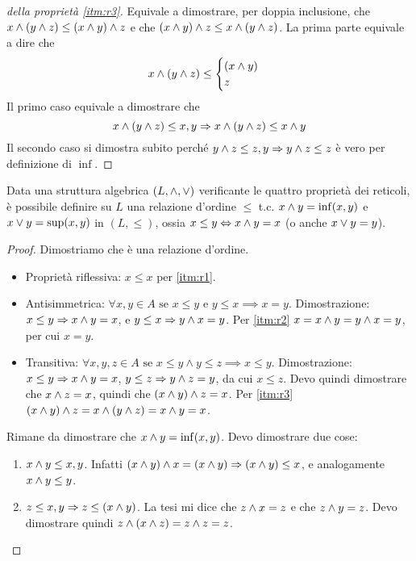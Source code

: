 \begin{proof}[della propriet\`a \ref{itm:r3}]
Equivale a dimostrare, per doppia inclusione, che $x \wedge ( y \wedge z) \leq (x \wedge y) \wedge z$ e che $(x \wedge y) \wedge z \leq x \wedge ( y \wedge z)$. La prima parte equivale a dire che
\[
x \wedge (y \wedge z) \leq 
\begin{cases}
(x \wedge y) \\
 z
 \end{cases}
\]
Il primo caso equivale a dimostrare che
\[
x \wedge (y \wedge z) \leq x, y \Rightarrow x \wedge (y \wedge z) \leq x \wedge y
\]
Il secondo caso si dimostra subito perch\'e $y \wedge z \leq z, y \Rightarrow y \wedge z \leq z$ \`e vero per definizione di $\inf$. 
\end{proof}

\begin{theorem}
Data una struttura algebrica $(L, \wedge, \vee)$ verificante le quattro propriet\`a dei reticoli, \`e possibile definire su $L$ una relazione d'ordine $\le$ t.c. $ x \wedge y = \inf(x,y) $ e $ x \vee y = \sup(x,y) $ in $ (L, \le)$, ossia $x \le y \Leftrightarrow x \wedge y = x $ (o anche $ x \vee y = y$).
\end{theorem}
\begin{proof}
Dimostriamo che \`e una relazione d'ordine.
\begin{itemize}
    \item Propriet\`a riflessiva: $x \le x$ per \ref{itm:r1}.
    \item Antisimmetrica: $\forall x, y \in A \text{ se } x \leq y \text{ e }  y \leq x \implies x = y$. Dimostrazione: $x \le y \Rightarrow x \wedge y = x$, e $y \le x \Rightarrow y \wedge x = y$. Per \ref{itm:r2} $x = x \wedge y = y \wedge x = y$, per cui $x = y$.
    \item Transitiva: $\forall x, y, z \in A \text{ se } x \leq y \land y \leq z \implies x \leq y$. Dimostrazione: $x \le y \Rightarrow x \wedge y = x$, $y \le z \Rightarrow y \wedge z = y$, da cui $x \le z$. Devo quindi dimostrare che $x \wedge z = x$, quindi che $(x \wedge y) \wedge z = x$. Per \ref{itm:r3} $(x \wedge y) \wedge z = x \wedge (y \wedge z) = x \wedge y = x$. 
\end{itemize}
Rimane da dimostrare che $x \wedge y = \inf(x,y)$. Devo dimostrare due cose:
\begin{enumerate}
    \item $x \wedge y \le x, y$. Infatti $(x \wedge y) \wedge x = (x \wedge y) \Rightarrow (x \wedge y) \le x$, e analogamente $x \wedge y \le y$.
    \item $z \le x, y \Rightarrow z \le (x \wedge y)$. La tesi mi dice che $z \wedge x = z$ e che $z \wedge y = z$. Devo dimostrare quindi $z \wedge (x \wedge z) = z \wedge z = z$.
\end{enumerate}
\end{proof}

